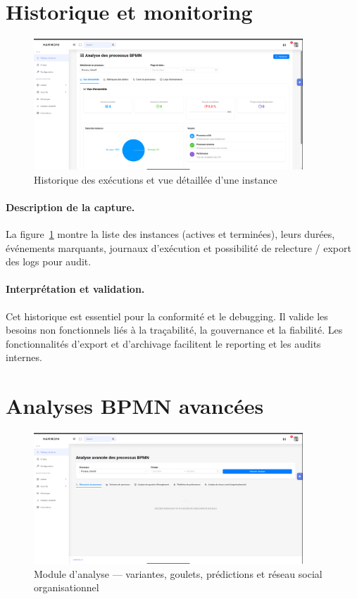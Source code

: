 \section{Historique et monitoring}

\begin{figure}[H]
    \centering
    \includegraphics[width=0.9\textwidth]{Images/historique.png}
    \caption{Historique des exécutions et vue détaillée d’une instance}
    \label{fig:historique}
\end{figure}

\paragraph{Description de la capture.}  
La figure~\ref{fig:historique} montre la liste des instances (actives et terminées), leurs durées, événements marquants, journaux d’exécution et possibilité de relecture / export des logs pour audit.

\paragraph{Interprétation et validation.}  
Cet historique est essentiel pour la conformité et le debugging. Il valide les besoins non fonctionnels liés à la traçabilité, la gouvernance et la fiabilité. Les fonctionnalités d’export et d’archivage facilitent le reporting et les audits internes.

\section{Analyses BPMN avancées}

\begin{figure}[H]
    \centering
    \includegraphics[width=0.9\textwidth]{Images/avancee.png}
    \caption{Module d’analyse — variantes, goulets, prédictions et réseau social organisationnel}
    \label{fig:analyse}
\end{figure}

